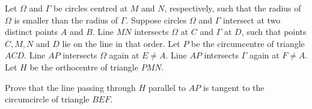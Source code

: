 Let $\Omega$ and $\Gamma$ be circles centred at $M$ and $N$, respectively, such that the radius of $\Omega$ is smaller than the radius of $\Gamma$. Suppose circles $\Omega$ and $\Gamma$ intersect at two distinct points $A$ and $B$. Line $MN$ intersects $\Omega$ at $C$ and $\Gamma$ at $D$, such that points $C,M,N$ and $D$ lie on the line in that order. Let $P$ be the circumcentre of triangle $ACD$. Line $AP$ intersects $\Omega$ again at $E\neq A$. Line $AP$ intersects $\Gamma$ again at $F\neq A$. Let $H$ be the orthocentre of triangle $PMN$.

Prove that the line passing through $H$ parallel to $AP$ is tangent to the circumcircle of triangle $BEF$.
